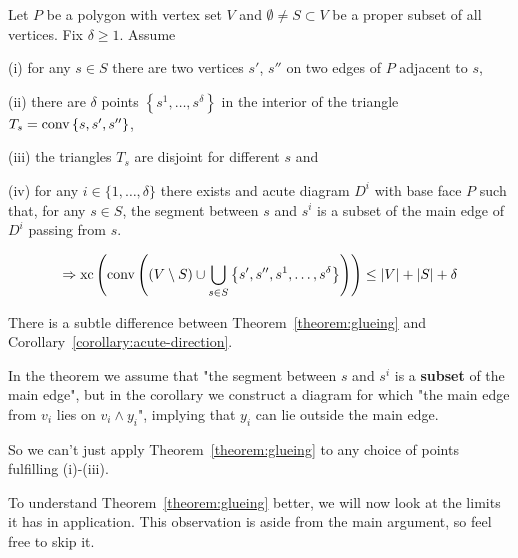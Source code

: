 \begin{theorem}\label{theorem:glueing}
  Let $P$ be a polygon with vertex set $V$ and $\emptyset \neq S \subset V$ be a proper subset of all vertices. Fix $\delta \geq 1$. Assume

  (i) for any $s \in S$ there are two vertices $s'$, $s''$ on two edges of $P$ adjacent to $s$,

  (ii) there are $\delta$ points $\left\{s^1, \dots, s^\delta \right\}$ in the interior of the triangle ${T_s = \operatorname{conv} \left\{s,s',s''\right\}}$,
  
  (iii) the triangles $T_s$ are disjoint for different $s$ and

  (iv) for any $i \in \{1,\dots,\delta\}$ there exists and acute diagram $D^i$ with base face $P$ such that, for any $s \in S$, the segment between $s$ and $s^i$ is a subset of the main edge of $D^i$ passing from $s$. 
  
  $$\Rightarrow \operatorname{xc}\left( \operatorname{conv}\left( (V \setminus S) \cup \bigcup_{s \in S} \left\{ s',s'',s^1,\dots,s^\delta \right\}  \right) \right) \leq \lvert V\rvert + \lvert S\rvert + \delta$$
\end{theorem}

\begin{remark}\label{remark:pitfall}
  There is a subtle difference between Theorem~\ref{theorem:glueing} and Corollary~\ref{corollary:acute-direction}.

  In the theorem we assume that "the segment between $s$ and $s^i$ is a \textbf{subset} of the main edge", but in the corollary we construct a diagram for which "the main edge from $v_i$ lies on $v_i \wedge y_i$", implying that $y_i$ can lie outside the main edge. 

  So we can't just apply Theorem~\ref{theorem:glueing} to any choice of points fulfilling (i)-(iii).
\end{remark}

To understand Theorem~\ref{theorem:glueing} better, we will now look at the limits it has in application. This observation is aside from the main argument, so feel free to skip it.

